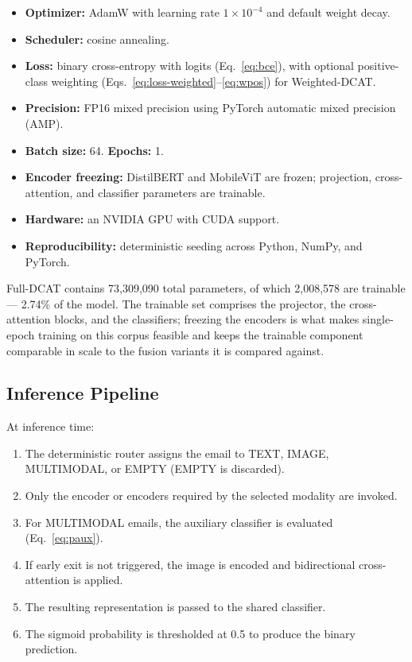 \documentclass[10pt,twoside]{article}
\begin{document}
\begin{itemize}
\item \textbf{Optimizer:} AdamW \citep{loshchilov2019adamw} with learning rate $1 \times 10^{-4}$ and default weight decay.
\item \textbf{Scheduler:} cosine annealing.
\item \textbf{Loss:} binary cross-entropy with logits (Eq.~\eqref{eq:bce}), with optional positive-class weighting (Eqs.~\eqref{eq:loss-weighted}--\eqref{eq:wpos}) for Weighted-DCAT.
\item \textbf{Precision:} FP16 mixed precision using PyTorch automatic mixed precision (AMP).
\item \textbf{Batch size:} 64. \textbf{Epochs:} 1.
\item \textbf{Encoder freezing:} DistilBERT and MobileViT are frozen; projection, cross-attention, and classifier parameters are trainable.
\item \textbf{Hardware:} an NVIDIA GPU with CUDA support.
\item \textbf{Reproducibility:} deterministic seeding across Python, NumPy, and PyTorch.
\end{itemize}

Full-DCAT contains 73,309,090 total parameters, of which 2,008,578 are trainable --- 2.74\% of the model. The trainable set comprises the projector, the cross-attention blocks, and the classifiers; freezing the encoders is what makes single-epoch training on this corpus feasible and keeps the trainable component comparable in scale to the fusion variants it is compared against.

\subsection{Inference Pipeline}\label{sec:inference}

At inference time:

\begin{enumerate}
\item The deterministic router assigns the email to TEXT, IMAGE, MULTIMODAL, or EMPTY (EMPTY is discarded).
\item Only the encoder or encoders required by the selected modality are invoked.
\item For MULTIMODAL emails, the auxiliary classifier is evaluated (Eq.~\eqref{eq:paux}).
\item If early exit is not triggered, the image is encoded and bidirectional cross-attention is applied.
\item The resulting representation is passed to the shared classifier.
\item The sigmoid probability is thresholded at 0.5 to produce the binary prediction.
\end{enumerate}
\end{document}
